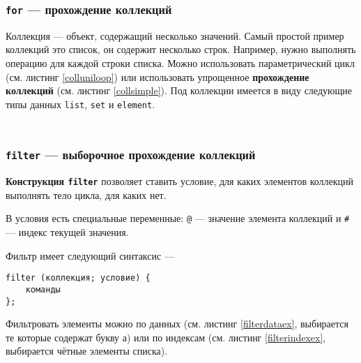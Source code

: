 \begin{sourcecode}
	\label{dowhileex}
    \inputminted[linenos]{icl}{../sources/dowhileex.icL}
\end{sourcecode}

\subsubsection{\texttt{for} — прохождение коллекций}

{Коллекция} — объект, содержащий несколько значений. Самый простой пример коллекций это список, он содержит несколько строк. Например, нужно выполнять операцию для каждой строки списка. Можно использовать параметрический цикл (см. листинг \ref{colluniloop}) или использовать упрощенное {\bf прохождение коллекций} (см. листинг \ref{collsimple}). Под коллекции имеется в виду следующие типы данных \texttt{list}, \texttt{set} и \texttt{element}.
\begin{sourcecode}
	\label{colluniloop}
    \inputminted[linenos]{icl}{../sources/colluniloop.icL}
\end{sourcecode}

\begin{sourcecode}
	\label{collsimple}
    \inputminted[linenos]{icl}{../sources/collsimple.icL}
\end{sourcecode}

\subsubsection{\texttt{filter} — выборочное прохождение коллекций}

{\bf Конструкция \texttt{filter}} позволяет ставить условие, для каких элементов коллекций выполнять тело цикла, для каких нет.

В условия есть специальные переменные: \texttt{@} — значение элемента коллекций и \texttt{#} — индекс текущей значения.

Фильтр имеет следующий синтаксис —
\begin{verbatim}
filter (коллекция; условие) {
	команды
};
\end{verbatim}

Фильтровать элементы можно по данных (см. листинг \ref{filterdataex}, выбирается те которые содержат букву а) или по индексам (см. листинг \ref{filterindexex}, выбирается чётные элементы списка).

